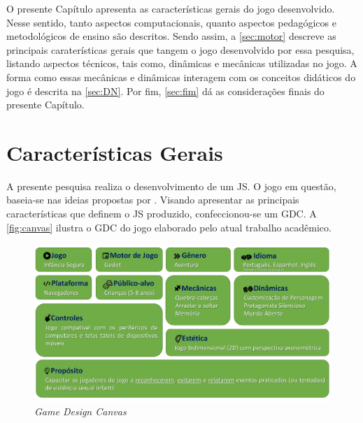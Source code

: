 O presente Capítulo apresenta as características gerais do jogo desenvolvido. Nesse sentido, tanto aspectos computacionais, quanto aspectos pedagógicos e metodológicos de ensino são descritos. Sendo assim, a \autoref{sec:motor} descreve as principais caraterísticas gerais que tangem o jogo desenvolvido por essa pesquisa, listando aspectos técnicos, tais como, dinâmicas e mecânicas utilizadas no jogo. A forma como essas mecânicas e dinâmicas interagem com os conceitos didáticos do jogo é descrita na \autoref{sec:DN}. Por fim, \autoref{sec:fim} dá as considerações finais do presente Capítulo. 


\section{Características Gerais}\label{sec:motor}

A presente pesquisa realiza o desenvolvimento de um \acf{JS}. O jogo em questão, baseia-se nas ideias propostas por . Visando apresentar as principais características que definem o \ac{JS} produzido, confeccionou-se um \ac{GDC}. A \autoref{fig:canvas} ilustra o \acl{GDC} do jogo elaborado pelo atual trabalho acadêmico. 

\begin{figure}[hbt!]
  \caption{\label{fig:canvas}\textit{Game Design Canvas}}\vspace{-0.2cm}
  \begin{center}
    \includegraphics[width=\linewidth]{./Visuais/canvas.pdf}
    \end{center}\vspace{-0.4cm}
\end{figure}

